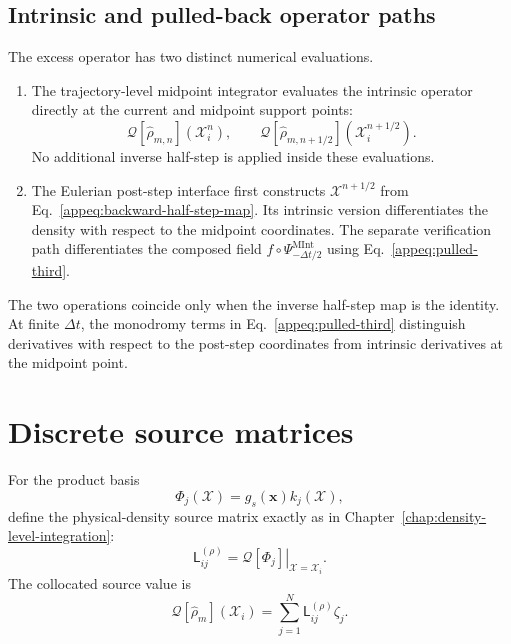 \documentclass[
  11pt,
  letterpaper,
  onehalfspacing,
  normalmargins,
  equalmargins,
  oneside
]{ut-thesis}
\begin{document}
\subsection{Intrinsic and pulled-back operator paths}
\label{appsubsec:operator-paths}

The excess operator has two distinct numerical evaluations.
\begin{enumerate}
\item
The trajectory-level midpoint integrator evaluates the intrinsic operator
directly at the current and midpoint support points:
\[
\mathcal Q\left[\widehat{\rho}_{m,n}\right]
\left(\boldsymbol{\mathcal X}_i^n\right),
\qquad
\mathcal Q\left[\widehat{\rho}_{m,n+1/2}\right]
\left(\boldsymbol{\mathcal X}_i^{n+1/2}\right).
\]
No additional inverse half-step is applied inside these evaluations.

\item
The Eulerian post-step interface first constructs
\(\boldsymbol{\mathcal X}^{n+1/2}\) from
Eq.~\eqref{appeq:backward-half-step-map}. Its intrinsic version differentiates
the density with respect to the midpoint coordinates. The separate
verification path differentiates the composed field
\(f\circ\Psi_{-\Delta t/2}^{\mathrm{MInt}}\) using
Eq.~\eqref{appeq:pulled-third}.
\end{enumerate}
The two operations coincide only when the inverse half-step map is the
identity. At finite \(\Delta t\), the monodromy terms in
Eq.~\eqref{appeq:pulled-third} distinguish derivatives with respect to the
post-step coordinates from intrinsic derivatives at the midpoint point.

\section{Discrete source matrices}
\label{appsec:source-matrices}

For the product basis
\begin{equation}
\Phi_j(\boldsymbol{\mathcal X})
=
g_s(\mathbf x)
k_j(\boldsymbol{\mathcal X}),
\label{appeq:appendix-product-basis}
\end{equation}
define the physical-density source matrix exactly as in
Chapter~\ref{chap:density-level-integration}:
\begin{equation}
\mathsf L^{(\rho)}_{ij}
=
\left.
\mathcal Q[\Phi_j]
\right|_{\boldsymbol{\mathcal X}=\boldsymbol{\mathcal X}_i}.
\label{appeq:physical-source-matrix}
\end{equation}
The collocated source value is
\begin{equation}
\mathcal Q[\widehat{\rho}_m]
\left(\boldsymbol{\mathcal X}_i\right)
=
\sum_{j=1}^{N}
\mathsf L^{(\rho)}_{ij}\zeta_j.
\label{appeq:source-vector}
\end{equation}
\end{document}
